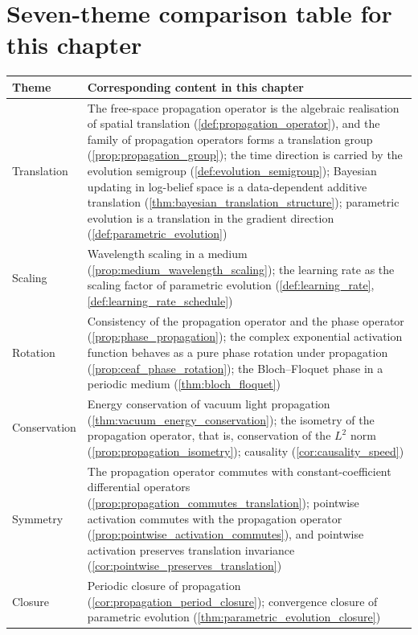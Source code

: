 \section*{Seven-theme comparison table for this chapter}

\begin{center}
\renewcommand{\arraystretch}{1.25}
\begin{tabularx}{\linewidth}{@{}>{\raggedright\arraybackslash\hspace{0pt}}p{2.8cm} >{\raggedright\arraybackslash\hspace{0pt}}X@{}}
\toprule
Theme & Corresponding content in this chapter \\
\midrule
Translation & The free-space propagation operator is the algebraic realisation of spatial translation (\cref{def:propagation_operator}), and the family of propagation operators forms a translation group (\cref{prop:propagation_group}); the time direction is carried by the evolution semigroup (\cref{def:evolution_semigroup}); Bayesian updating in log-belief space is a data-dependent additive translation (\cref{thm:bayesian_translation_structure}); parametric evolution is a translation in the gradient direction (\cref{def:parametric_evolution}) \\
Scaling & Wavelength scaling in a medium (\cref{prop:medium_wavelength_scaling}); the learning rate as the scaling factor of parametric evolution (\cref{def:learning_rate}, \cref{def:learning_rate_schedule}) \\
Rotation & Consistency of the propagation operator and the phase operator (\cref{prop:phase_propagation}); the complex exponential activation function behaves as a pure phase rotation under propagation (\cref{prop:ceaf_phase_rotation}); the Bloch--Floquet phase in a periodic medium (\cref{thm:bloch_floquet}) \\
Conservation & Energy conservation of vacuum light propagation (\cref{thm:vacuum_energy_conservation}); the isometry of the propagation operator, that is, conservation of the $L^2$ norm (\cref{prop:propagation_isometry}); causality (\cref{cor:causality_speed}) \\
Symmetry & The propagation operator commutes with constant-coefficient differential operators (\cref{prop:propagation_commutes_translation}); pointwise activation commutes with the propagation operator (\cref{prop:pointwise_activation_commutes}), and pointwise activation preserves translation invariance (\cref{cor:pointwise_preserves_translation}) \\
Closure & Periodic closure of propagation (\cref{cor:propagation_period_closure}); convergence closure of parametric evolution (\cref{thm:parametric_evolution_closure}) \\

\end{tabularx}
\end{center}
